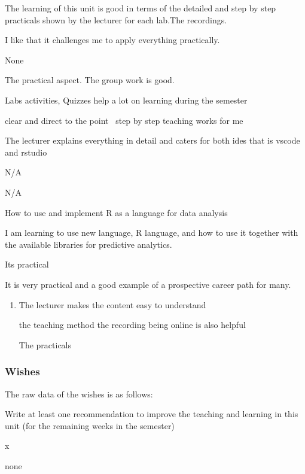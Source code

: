 \documentclass[
]{article}
\providecommand{\tightlist}{%
  \setlength{\itemsep}{0pt}\setlength{\parskip}{0pt}}
\begin{document}
\begin{enumerate}
\begin{itemize}
    The learning of this unit is good in terms of the detailed and step
    by step practicals shown by the lecturer for each lab.The
    recordings.

    I like that it challenges me to apply everything practically.

    None

    The practical aspect. The group work is good.

    Labs activities, Quizzes help a lot on learning during the semester

    clear and direct to the point~ step by step teaching works for me

    The lecturer explains everything in detail and caters for both ides
    that is vscode and rstudio

    N/A

    N/A~

    How to use and implement R as a language for data analysis

    I am learning to use new language, R language, and how to use it
    together with the available libraries for predictive analytics. ~

    Its practical~

    It is very practical and a good example of a prospective career path
    for many.

    \begin{enumerate}
    \def\labelenumii{\arabic{enumii}.}
    \tightlist
    \item
      The lecturer makes the content easy to understand

      the teaching method the recording being online is also helpful~

      The practicals
    \end{enumerate}
  \end{itemize}
\end{enumerate}

\newpage

\subsubsection{Wishes}\label{wishes}

The raw data of the wishes is as follows:

Write at least one recommendation to improve the teaching and learning
in this unit (for the remaining weeks in the semester)

x

none
\end{document}
